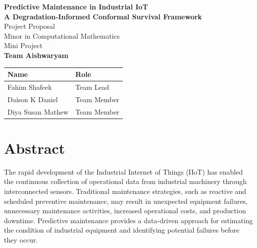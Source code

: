 \documentclass[12pt, a4paper]{article}
\begin{document}
\begin{titlepage}
    \centering
    \vspace*{2cm}
    
    {\LARGE\bfseries Predictive Maintenance in Industrial IoT}\\[0.8cm]
    {\Large\bfseries A Degradation-Informed Conformal Survival Framework}\\[2cm]
    
    {\Large Project Proposal}\\[0.5cm]
    {\large Minor in Computational Mathematics}\\[0.3cm]
    {\large Mini Project}\\[3cm]
    
    {\Large\bfseries Team Aishwaryam}\\[1cm]
    
    \begin{tabular}{l l}
        \toprule
        \textbf{Name} & \textbf{Role} \\
        \midrule
        Fahim Shafeek   & Team Lead   \\
        Daison K Daniel & Team Member \\
        Diya Susan Mathew & Team Member \\
        \bottomrule
    \end{tabular}
    
    \vfill
\end{titlepage}

\newpage
\tableofcontents
\newpage

\section{Abstract}

The rapid development of the Industrial Internet of Things (IIoT) has enabled the continuous collection of operational data from industrial machinery through interconnected sensors. Traditional maintenance strategies, such as reactive and scheduled preventive maintenance, may result in unexpected equipment failures, unnecessary maintenance activities, increased operational costs, and production downtime. Predictive maintenance provides a data-driven approach for estimating the condition of industrial equipment and identifying potential failures before they occur.
\end{document}
